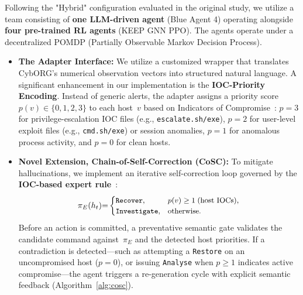\documentclass[letterpaper, 10 pt, conference]{ieeeconf}
\begin{document}
Following the "Hybrid" configuration evaluated in the original study, we utilize a team consisting of \textbf{one LLM-driven agent} (Blue Agent 4) operating alongside \textbf{four pre-trained RL agents} (KEEP GNN PPO). The agents operate under a decentralized POMDP (Partially Observable Markov Decision Process).

\begin{itemize}
    \item \textbf{The Adapter Interface:} We utilize a customized wrapper that translates CybORG's numerical observation vectors into structured natural language. A significant enhancement in our implementation is the \textbf{IOC-Priority Encoding}. Instead of generic alerts, the adapter assigns a priority score $p(v) \in \{0,1,2,3\}$ to each host~$v$ based on Indicators of Compromise~\cite{arXiv:2410.17351}: $p{=}3$ for privilege-escalation IOC files (e.g., \texttt{escalate.sh/exe}), $p{=}2$ for user-level exploit files (e.g., \texttt{cmd.sh/exe}) or session anomalies, $p{=}1$ for anomalous process activity, and $p{=}0$ for clean hosts.
    
    \item \textbf{Novel Extension, Chain-of-Self-Correction (CoSC):} To mitigate hallucinations, we implement an iterative self-correction loop governed by the \textbf{IOC-based expert rule}~\cite{arXiv:2410.17351}:
\begin{equation}
\label{eq:ioc_expert}
\small
  \pi_E(h_t) {=}
  \begin{cases}
    \texttt{Recover},      & p(v) \geq 1 \;\text{(host IOCs)}, \\
    \texttt{Investigate},  & \text{otherwise}.
  \end{cases}
\end{equation}
Before an action is committed, a preventative semantic gate validates the candidate command against~$\pi_E$ and the detected host priorities. If a contradiction is detected---such as attempting a \texttt{Restore} on an uncompromised host ($p{=}0$), or issuing \texttt{Analyse} when $p{\geq}1$ indicates active compromise---the agent triggers a re-generation cycle with explicit semantic feedback (Algorithm~\ref{alg:cosc}).
\end{itemize}
\end{document}
